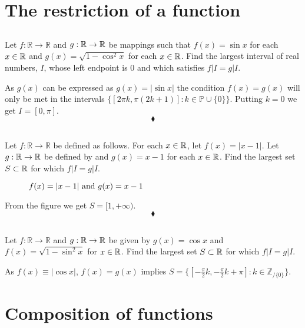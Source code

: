  \section{The restriction of a function}
\subsection{}
\begin{tcolorbox}
Let $f:\mathbb{R}\rightarrow \mathbb{R}$ and $g:\mathbb{R}\rightarrow \mathbb{R}$ be mappings such that $f(x)=\sin x$ for each $x\in \mathbb{R}$ and $g(x)=\sqrt{1-\cos^2 x}$ for each $x\in\mathbb{R}$. Find the largest interval of real numbers, $I$, whose left endpoint is $0$ and which satisfies $f|I=g|I$.
\end{tcolorbox}
As $g(x)$ can be expressed as $g(x)=|\sin{x}|$ the condition $f(x)=g(x)$ will only be met in the intervals  $\{[2\pi k,\pi (2k+1)]:k\in \mathbb{P}\cup \{0\}\}$. Putting $k=0$ we get $I=[0,\pi]$.
$$\blacklozenge$$

\subsection{}
\begin{tcolorbox}
Let $f:\mathbb{R}\rightarrow \mathbb{R}$ be defined as follows. For each $x\in \mathbb{R}$, let $f(x)=|x-1|$. Let $g:\mathbb{R}\rightarrow \mathbb{R}$  be defined by and $g(x)=x-1$ for each $x\in\mathbb{R}$. Find the largest set $S\subset\mathbb{R}$ for which  $f|I=g|I$.
\end{tcolorbox}
\begin{figure}[H]%
    \centering
    
\caption{$f(x)=|x-1| \text{ and } g(x)=x-1$}
\label{fig:fig_p8b}
\end{figure}
From the figure we get $S=[1,+\infty)$.
$$\blacklozenge$$

\subsection{}
\begin{tcolorbox}
Let $f:\mathbb{R}\rightarrow \mathbb{R}$ and $g:\mathbb{R}\rightarrow \mathbb{R}$ be given by $g(x)=\cos x $ and $f(x)=\sqrt{1-\sin^2 x}$ for $x\in \mathbb{R}$. Find the largest set $S\subset\mathbb{R}$ for which  $f|I=g|I$.
\end{tcolorbox}
As $f(x)\equiv|\cos{x}|$,  $f(x)=g(x)$ implies $S=\{[-\frac{\pi}{2} k,-\frac{\pi}{2}k+\pi]:k\in \mathbb{Z}_{/ \{0\}}\}$.

\newpage
 \section{Composition of functions}
